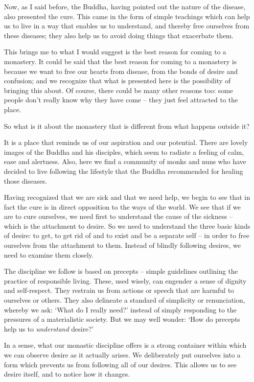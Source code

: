 Now, as I said before, the Buddha, having pointed out the nature of the disease, also presented the cure. This came in the form of simple teachings which can help us to live in a way that enables us to understand, and thereby free ourselves from these diseases; they also help us to avoid doing things that exacerbate them.

This brings me to what I would suggest is the best reason for coming to a monastery. It could be said that the best reason for coming to a monastery is because we want to free our hearts from disease, from the bonds of desire and confusion; and we recognize that what is presented here is the possibility of bringing this about. Of course, there could be many other reasons too: some people don't really know why they have come -- they just feel attracted to the place. 

So what is it about the monastery that is different from what happens outside it?

It is a place that reminds us of our aspiration and our potential. There are lovely images of the Buddha and his disciples, which seem to radiate a feeling of calm, ease and alertness. Also, here we find a community of monks and nuns who have decided to live following the lifestyle that the Buddha recommended for healing those diseases.

Having recognized that we are sick and that we need help, we begin to see that in fact the cure is in direct opposition to the ways of the world. We see that if we are to cure ourselves, we need first to understand the cause of the sickness -- which is the attachment to desire. So we need to understand the three basic kinds of desire: to get, to get rid of and to exist and be a separate self -- in order to free ourselves from the attachment to them. Instead of blindly following desires, we need to examine them closely.

The discipline we follow is based on precepts -- simple guidelines outlining the practice of responsible living. These, used wisely, can engender a sense of dignity and self-respect. They restrain us from actions or speech that are harmful to ourselves or others. They also delineate a standard of simplicity or renunciation, whereby we ask: `What do I really need?' instead of simply responding to the pressures of a materialistic society. But we may well wonder: `How do precepts help us to \textit{understand} desire?'

In a sense, what our monastic discipline offers is a strong container within which we can observe desire as it actually arises. We deliberately put ourselves into a form which prevents us from following all of our desires. This allows us to see desire itself, and to notice how it changes. 

